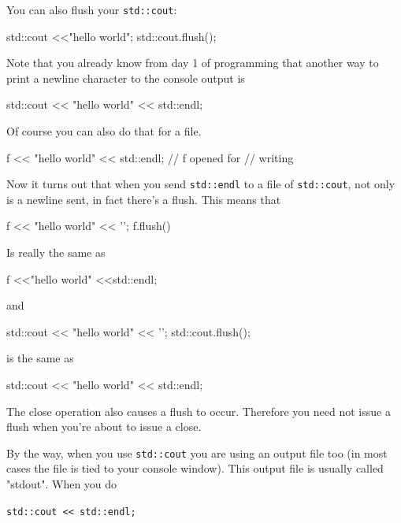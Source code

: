 You can also flush your \texttt{std::cout}:

\begin{console}
std::cout <<"hello world";
std::cout.flush();
\end{console}

Note that you already know from day 1 of programming that another way to
print a newline character to the console output is

\begin{console}
std::cout << "hello world" << std::endl;
\end{console}

Of course you can also do that for a file.

\begin{console}
f << "hello world" << std::endl; // f opened for
                                 // writing 
\end{console}

Now it turns out that when you send \texttt{std::endl} to a file of \texttt{std::cout}, not only is a newline sent, in fact there's a flush. This means that

\begin{console}
f << "hello world" << '\n';
f.flush() 
\end{console}

Is really the same as

\begin{console}
f <<"hello world" <<std::endl;
\end{console}

and

\begin{console}
std::cout << "hello world" << '\n';
std::cout.flush();
\end{console}

is the same as

\begin{console} 
std::cout << "hello world" << std::endl;
\end{console}

The close operation also causes a flush to occur. Therefore you need not issue a flush when you're about to issue a close.

By the way, when you use \texttt{std::cout} you are using an output file too (in most cases the file is tied to your console window). This output file is usually called "stdout". When you do

\begin{center}
\texttt{std::cout << std::endl;}
\end{center}

